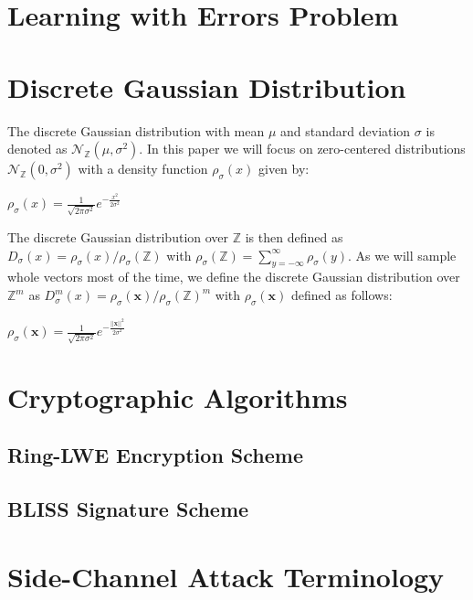 \section{Learning with Errors Problem}

\section{Discrete Gaussian Distribution}
The discrete Gaussian distribution with mean \(\mu\) and standard deviation \(\sigma\) is denoted as \(\mathcal{N}_\mathbb{Z} (\mu, \sigma^2)\). In this paper we will focus on zero-centered distributions \(\mathcal{N}_\mathbb{Z} (0, \sigma^2)\) with a density function \(\rho_\sigma(x)\) given by:
\begin{center}
	\(\rho_\sigma(x)=\frac{1}{\sqrt{2\pi \sigma^2}}e^{-\frac{x^2}{2\sigma^2}}\)
\end{center}
The discrete Gaussian distribution over \(\mathbb{Z}\) is then defined as \(D_\sigma(x)=\rho_\sigma(x)/\rho_\sigma(\mathbb{Z})\) with \(\rho_\sigma(\mathbb{Z})=\sum_{y=-\infty}^{\infty} \rho_\sigma(y)\). As we will sample whole vectors most of the time, we define the discrete Gaussian distribution over \(\mathbb{Z}^m\) as \(D_\sigma^m(x)=\rho_\sigma(\textbf{x})/\rho_\sigma(\mathbb{Z})^m\) with \(\rho_\sigma(\textbf{x})\) defined as follows:
\begin{center}
	\(\rho_\sigma(\textbf{x})=\frac{1}{\sqrt{2\pi \sigma^2}}e^{-\frac{||\textbf{x}||^2}{2\sigma^2}}\)
\end{center}
\section{Cryptographic Algorithms}

\subsection{Ring-LWE Encryption Scheme}

\subsection{BLISS Signature Scheme}

\section{Side-Channel Attack Terminology}